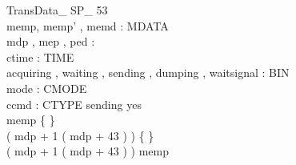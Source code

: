 \begin{schema}{TransData\_ SP\_ 53}\\
 memp, memp' , memd : \seq MDATA \\
 mdp , mep , ped : \nat \\
 ctime : TIME \\
 acquiring , waiting , sending , dumping , waitsignal : BIN \\
 mode : CMODE \\
 ccmd : CTYPE 
\where
 sending \neq yes \\
 memp \neq \{ \} \\
 ( mdp + 1 \upto ( mdp + 43 ) ) \neq \{ \} \\
 ( mdp + 1 \upto ( mdp + 43 ) ) \subset \dom memp
\end{schema}

